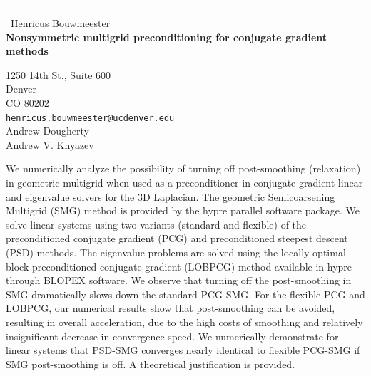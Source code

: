 \documentclass{report}
\begin{document}
\begin{center}
\rule{6in}{1pt} \
{\large Henricus Bouwmeester \\
{\bf Nonsymmetric multigrid preconditioning for conjugate gradient methods}}

1250 14th St., Suite 600 \\ Denver \\ CO 80202
\\
{\tt henricus.bouwmeester@ucdenver.edu}\\
Andrew Dougherty\\
Andrew V. Knyazev\end{center}

We numerically analyze the possibility of turning off post-smoothing
(relaxation) in geometric multigrid when used as a preconditioner in
conjugate gradient linear and eigenvalue solvers for the 3D Laplacian.
The geometric Semicoarsening Multigrid (SMG) method is provided by the
hypre parallel software package. We solve linear systems using two
variants (standard and flexible) of the preconditioned conjugate gradient
(PCG) and preconditioned steepest descent (PSD) methods. The eigenvalue
problems are solved using the locally optimal block preconditioned
conjugate gradient (LOBPCG) method available in hypre through BLOPEX
software. We observe that turning off the post-smoothing in SMG
dramatically slows down the standard PCG-SMG. For the flexible PCG and
LOBPCG, our numerical results show that post-smoothing can be avoided,
resulting in overall acceleration, due to the high costs of smoothing and
relatively insignificant decrease in convergence speed. We numerically
demonstrate for linear systems that PSD-SMG converges nearly identical to
flexible PCG-SMG if SMG post-smoothing is off. A theoretical
justification is provided.
\end{document}
